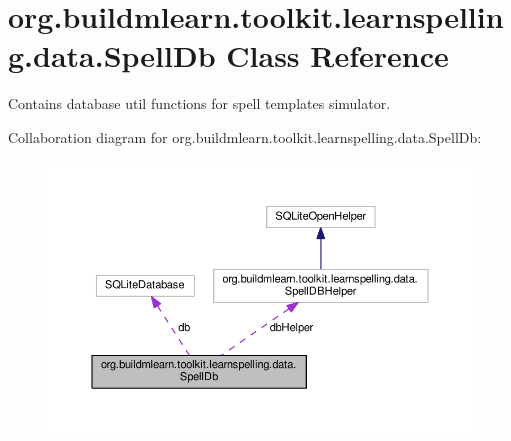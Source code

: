 \hypertarget{classorg_1_1buildmlearn_1_1toolkit_1_1learnspelling_1_1data_1_1SpellDb}{}\section{org.\+buildmlearn.\+toolkit.\+learnspelling.\+data.\+Spell\+Db Class Reference}
\label{classorg_1_1buildmlearn_1_1toolkit_1_1learnspelling_1_1data_1_1SpellDb}


Contains database util functions for spell template\textquotesingle{}s simulator.  




Collaboration diagram for org.\+buildmlearn.\+toolkit.\+learnspelling.\+data.\+Spell\+Db\+:
\nopagebreak
\begin{figure}[H]
\begin{center}
\leavevmode
\includegraphics[width=350pt]{classorg_1_1buildmlearn_1_1toolkit_1_1learnspelling_1_1data_1_1SpellDb__coll__graph}
\end{center}
\end{figure}
